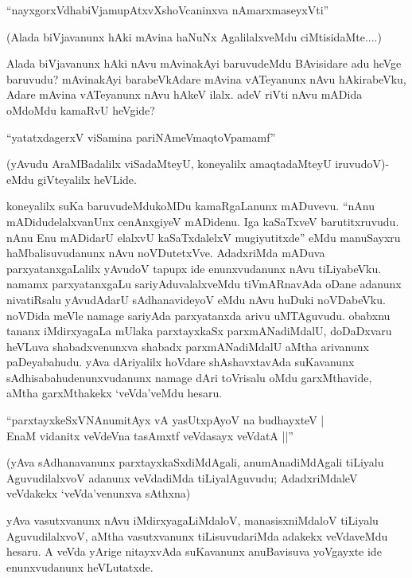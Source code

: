 \begin{shloka}
``nayxgorxVdhabiVjamupAtxvXshoVcaninxva nAmarxmaseyxVti''
\end{shloka}

(Alada biVjavanunx hAki mAvina haNuNx AgalilalxveMdu ciMtisidaMte....)

Alada biVjavanunx hAki nAvu mAvinakAyi baruvudeMdu BAvisidare adu heVge baruvudu? mAvinakAyi barabeVkAdare mAvina vATeyanunx nAvu hAkirabeVku, Adare mAvina vATeyanunx nAvu hAkeV ilalx. adeV riVti nAvu mADida oMdoMdu kamaRvU heVgide?

\begin{shloka}
``yatatxdagerxV viSamina pariNAmeV\s maqtoVpamamf''
\end{shloka}

(yAvudu AraMBadalilx viSadaMteyU, koneyalilx amaqtadaMteyU iruvudoV)-eMdu giVteyalilx heVLide.

koneyalilx suKa baruvudeMdukoMDu kamaRgaLanunx mADuvevu. ``nAnu mADidudelalxvanUnx cenAnxgiyeV mADidenu. Iga kaSaTxveV barutitxruvudu. nAnu Enu mADidarU elalxvU kaSaTxdalelxV mugiyutitxde'' eMdu manuSayxru haMbalisuvudanunx nAvu noVDutetxVve. AdadxriMda mADuva parxyatanxgaLalilx yAvudoV tapupx ide enunxvudanunx nAvu tiLiyabeVku. namamx parxyatanxgaLu sariyAduvalalxveMdu tiVmARnavAda oDane adanunx nivatiRsalu yAvudAdarU sAdhanavideyoV eMdu nAvu huDuki noVDabeVku. noVDida meVle namage sariyAda parxyatanxda arivu uMTAguvudu. obabxnu tananx iMdirxyagaLa mUlaka parxtayxkaSx parxmANadiMdalU, doDaDxvaru heVLuva shabadxvenunxva shabadx parxmANadiMdalU aMtha arivanunx paDeyabahudu. yAva dAriyalilx hoVdare shAshavxtavAda suKavanunx sAdhisabahudenunxvudanunx namage dAri toVrisalu oMdu garxMthavide, aMtha garxMthakekx `veVda'veMdu hesaru.

\begin{shloka}
``parxtayxkeSxVNAnumitAyx vA yasUtxpAyoV na budhayxteV |\\
EnaM vidanitx veVdeVna tasAmxtf veVdasayx veVdatA ||''
\end{shloka}

(yAva sAdhanavanunx parxtayxkaSxdiMdAgali, anumAnadiMdAgali tiLiyalu AguvudilalxvoV adanunx veVdadiMda tiLiyalAguvudu; AdadxriMdaleV veVdakekx `veVda'venunxva sAthxna)

yAva vasutxvanunx nAvu iMdirxyagaLiMdaloV, manasisxniMdaloV tiLiyalu AguvudilalxvoV, aMtha vasutxvanunx tiLisuvudariMda adakekx veVdaveMdu hesaru. A veVda yArige nitayxvAda suKavanunx anuBavisuva yoVgayxte ide enunxvudanunx heVLutatxde.

